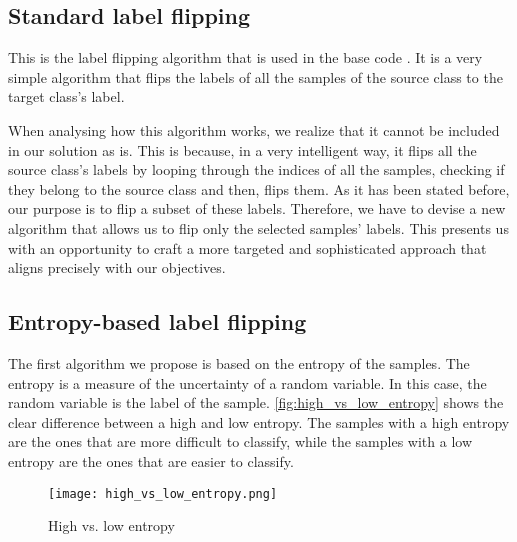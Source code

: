 \subsection{Standard label flipping}\label{sec:standard_label_flipping}
This is the label flipping algorithm that is used in the base code \cite{LFighter_code}. It is a very simple algorithm that flips the labels of all the samples of the source class to the target class's label.

When analysing how this algorithm works, we realize that it cannot be included in our solution as is. This is because, in a very intelligent way, it flips all the source class's labels by looping through the indices of all the samples, checking if they belong to the source class and then, flips them. As it has been stated before, our purpose is to flip a subset of these labels. Therefore, we have to devise a new algorithm that allows us to flip only the selected samples' labels. This presents us with an opportunity to craft a more targeted and sophisticated approach that aligns precisely with our objectives.

\subsection{Entropy-based label flipping}\label{sec:entropy_label_flipping}
The first algorithm we propose is based on the entropy of the samples. The entropy is a measure of the uncertainty of a random variable. In this case, the random variable is the label of the sample. \autoref{fig:high_vs_low_entropy} shows the clear difference between a high and low entropy. The samples with a high entropy are the ones that are more difficult to classify, while the samples with a low entropy are the ones that are easier to classify.

\begin{figure}[h]
        \centering
        \texttt{[image: high\_vs\_low\_entropy.png]}
        \caption{High vs. low entropy}
        \label{fig:high_vs_low_entropy}
\end{figure}

